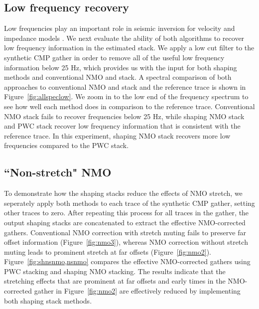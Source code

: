 

\subsection{Low frequency recovery}
Low frequencies play an important role in seismic inversion for velocity and impedance models \cite[]{kroode}.
We next evaluate the ability of both algorithms to recover low frequency information in the 
estimated stack. We apply a low cut filter to the synthetic CMP gather
in order to remove all of the useful low frequency information below 25 Hz, which provides us with the input for both shaping
methods and conventional NMO and stack. A spectral comparison of both approaches to conventional NMO and stack
and the reference trace is shown in Figure~\ref{fig:allspeclow}. We zoom in to the low end of the frequency spectrum
to see how well each method does in comparison to the reference trace. Conventional NMO stack fails
to recover frequencies below 25 Hz, while shaping NMO stack and PWC stack recover 
low frequency information that is consistent with the reference trace. In this experiment, shaping NMO stack 
recovers more low frequencies compared to the PWC stack. 
 

\subsection{``Non-stretch" NMO}
To demonstrate how the shaping stacks reduce the effects of NMO stretch, 
we seperately apply both methods to each trace of the synthetic CMP gather, setting other traces to zero. After repeating this process 
for all traces in the gather, the output shaping stacks are concatenated to extract the effective NMO-corrected gathers.
Conventional NMO correction with stretch muting fails to preserve far offset information (Figure~\ref{fig:nmo3}), 
whereas NMO correction without stretch muting leads to prominent stretch at far offsets (Figure~\ref{fig:nmo2}). 
Figure~\ref{fig:shnsnmo,nsnmo} compares the effective NMO-corrected gathers using PWC stacking and 
shaping NMO stacking. The results indicate that the stretching effects that are prominent at far offsets and early times in the NMO-corrected gather 
in Figure~\ref{fig:nmo2} are effectively reduced by implementing both shaping stack methods.

